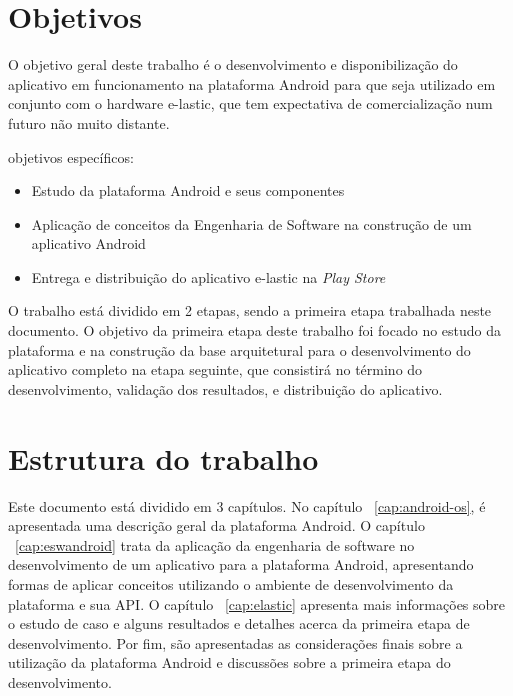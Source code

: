 \section{Objetivos}
O objetivo geral deste trabalho é o desenvolvimento e disponibilização do aplicativo em funcionamento na plataforma Android para que seja utilizado em conjunto com o hardware e-lastic, que tem expectativa de comercialização num futuro não muito distante.

objetivos específicos:
\begin{itemize}
\item Estudo da plataforma Android e seus componentes
\item Aplicação de conceitos da Engenharia de Software na construção de um aplicativo Android
\item Entrega e distribuição do aplicativo e-lastic na \textit{Play Store}
\end{itemize}

O trabalho está dividido em 2 etapas, sendo a primeira etapa trabalhada neste documento. O objetivo da primeira etapa deste trabalho foi focado no estudo da plataforma e na construção da base arquitetural para o desenvolvimento do aplicativo completo na etapa seguinte, que consistirá no término do desenvolvimento, validação dos resultados, e distribuição do aplicativo.
\section{Estrutura do trabalho}
Este documento está dividido em 3 capítulos. No capítulo ~\ref{cap:android-os}, é apresentada uma descrição geral da plataforma Android. O capítulo ~\ref{cap:eswandroid} trata da aplicação da engenharia de software no desenvolvimento de um aplicativo para a plataforma Android, apresentando formas de aplicar conceitos utilizando o ambiente de desenvolvimento da plataforma e sua API. O capítulo ~\ref{cap:elastic} apresenta mais informações sobre o estudo de caso e alguns resultados e detalhes acerca da primeira etapa de desenvolvimento. Por fim, são apresentadas as considerações finais sobre a utilização da plataforma Android e discussões sobre a primeira etapa do desenvolvimento.